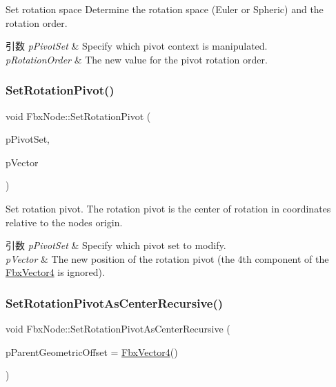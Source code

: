 Set rotation space Determine the rotation space (Euler or Spheric) and the rotation order. 
\begin{DoxyParams}{引数}
{\em p\+Pivot\+Set} & Specify which pivot context is manipulated. \\
\hline
{\em p\+Rotation\+Order} & The new value for the pivot rotation order. \\
\hline
\end{DoxyParams}
\mbox{\label{class_fbx_node_aa03d51b621dd88e32c1209b3d4a0aa7d}} 
\subsubsection{\texorpdfstring{Set\+Rotation\+Pivot()}{SetRotationPivot()}}
{\footnotesize\ttfamily void Fbx\+Node\+::\+Set\+Rotation\+Pivot (\begin{DoxyParamCaption}\item[{\hyperlink{class_fbx_node_ae62b7311ac4727654cdf1ebd5cbf7343}{E\+Pivot\+Set}}]{p\+Pivot\+Set,  }\item[{\hyperlink{class_fbx_vector4}{Fbx\+Vector4}}]{p\+Vector }\end{DoxyParamCaption})}

Set rotation pivot. The rotation pivot is the center of rotation in coordinates relative to the node\textquotesingle{}s origin. 
\begin{DoxyParams}{引数}
{\em p\+Pivot\+Set} & Specify which pivot set to modify. \\
\hline
{\em p\+Vector} & The new position of the rotation pivot (the 4th component of the \hyperlink{class_fbx_vector4}{Fbx\+Vector4} is ignored). \\
\hline
\end{DoxyParams}
\mbox{\label{class_fbx_node_a011db7d98b19fca54f6b9d8c97d251c5}} 
\subsubsection{\texorpdfstring{Set\+Rotation\+Pivot\+As\+Center\+Recursive()}{SetRotationPivotAsCenterRecursive()}}
{\footnotesize\ttfamily void Fbx\+Node\+::\+Set\+Rotation\+Pivot\+As\+Center\+Recursive (\begin{DoxyParamCaption}\item[{\hyperlink{class_fbx_vector4}{Fbx\+Vector4}}]{p\+Parent\+Geometric\+Offset = {\ttfamily \hyperlink{class_fbx_vector4}{Fbx\+Vector4}()} }\end{DoxyParamCaption})}

